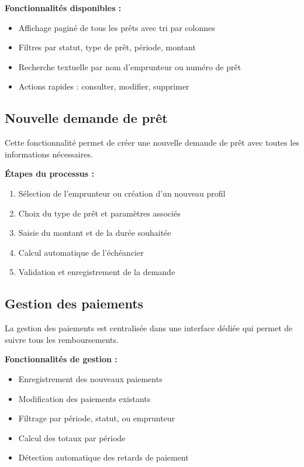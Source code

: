 \documentclass[12pt,a4paper]{report}
\begin{document}
\textbf{Fonctionnalités disponibles :}
\begin{itemize}
    \item Affichage paginé de tous les prêts avec tri par colonnes
    \item Filtres par statut, type de prêt, période, montant
    \item Recherche textuelle par nom d'emprunteur ou numéro de prêt
    \item Actions rapides : consulter, modifier, supprimer
\end{itemize}

\subsection{Nouvelle demande de prêt}

Cette fonctionnalité permet de créer une nouvelle demande de prêt avec toutes les informations nécessaires.

\textbf{Étapes du processus :}
\begin{enumerate}
    \item Sélection de l'emprunteur ou création d'un nouveau profil
    \item Choix du type de prêt et paramètres associés
    \item Saisie du montant et de la durée souhaitée
    \item Calcul automatique de l'échéancier
    \item Validation et enregistrement de la demande
\end{enumerate}

\subsection{Gestion des paiements}

La gestion des paiements est centralisée dans une interface dédiée qui permet de suivre tous les remboursements.

\textbf{Fonctionnalités de gestion :}
\begin{itemize}
    \item Enregistrement des nouveaux paiements
    \item Modification des paiements existants
    \item Filtrage par période, statut, ou emprunteur
    \item Calcul des totaux par période
    \item Détection automatique des retards de paiement
\end{itemize}
\end{document}
